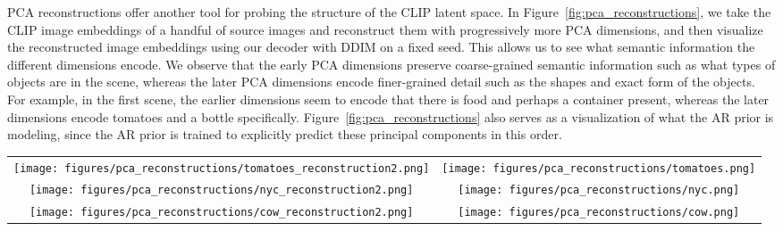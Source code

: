\documentclass{article}
\begin{document}
PCA reconstructions offer another tool for probing the structure of the CLIP latent space. In Figure~\ref{fig:pca_reconstructions}, we take the CLIP image embeddings of a handful of source images and reconstruct them with progressively more PCA dimensions, and then visualize the reconstructed image embeddings using our decoder with DDIM on a fixed seed. This allows us to see what semantic information the different dimensions encode. We observe that the early PCA dimensions preserve coarse-grained semantic information such as what types of objects are in the scene, whereas the later PCA dimensions encode finer-grained detail such as the shapes and exact form of the objects. For example, in the first scene, the earlier dimensions seem to encode that there is food and perhaps a container present, whereas the later dimensions encode tomatoes and a bottle specifically. Figure~\ref{fig:pca_reconstructions} also serves as a visualization of what the AR prior is modeling, since the AR prior is trained to explicitly predict these principal components in this order.

\begin{figure*}[t]
    \centering
    \setlength{\tabcolsep}{0.6pt}
    \renewcommand{\arraystretch}{0}
    \begin{tabular}{cc}
        \texttt{[image: figures/pca\_reconstructions/tomatoes\_reconstruction2.png]} & 
        \texttt{[image: figures/pca\_reconstructions/tomatoes.png]}
         \\
        \texttt{[image: figures/pca\_reconstructions/nyc\_reconstruction2.png]} &
        \texttt{[image: figures/pca\_reconstructions/nyc.png]}
         \\
         \texttt{[image: figures/pca\_reconstructions/cow\_reconstruction2.png]} &
        \texttt{[image: figures/pca\_reconstructions/cow.png]}
         \\
    \end{tabular}
    \caption{Visualization of reconstructions of CLIP latents from progressively more PCA dimensions (20, 30, 40, 80, 120, 160, 200, 320 dimensions), with the original source image on the far right. The lower dimensions preserve coarse-grained semantic information, whereas the higher dimensions encode finer-grained details about the exact form of the objects in the scene.}
    \label{fig:pca_reconstructions}
\end{figure*}
\end{document}
